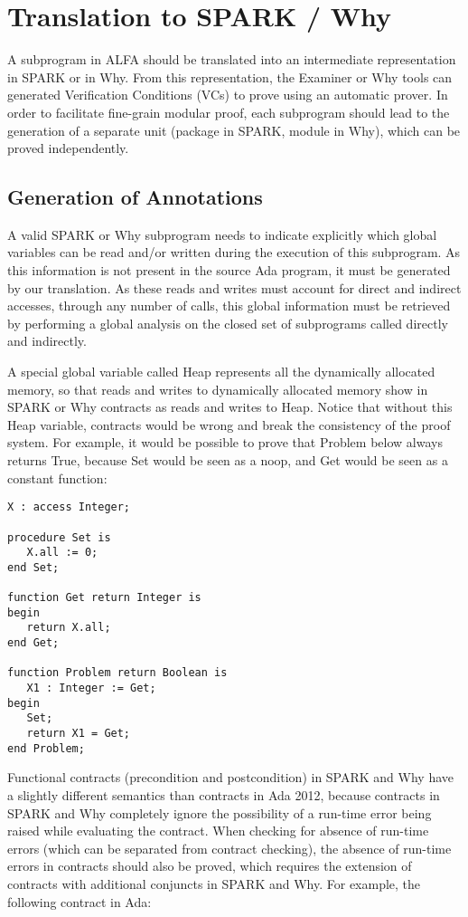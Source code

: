\documentclass{article}
\begin{document}
\section{Translation to SPARK / Why}

A subprogram in ALFA should be translated into an intermediate representation
in SPARK or in Why. From this representation, the Examiner or Why tools can
generated Verification Conditions (VCs) to prove using an automatic prover.  In
order to facilitate fine-grain modular proof, each subprogram should lead to
the generation of a separate unit (package in SPARK, module in Why), which can
be proved independently.

\subsection{Generation of Annotations}

A valid SPARK or Why subprogram needs to indicate explicitly which global
variables can be read and/or written during the execution of this
subprogram. As this information is not present in the source Ada program, it
must be generated by our translation. As these reads and writes must account
for direct and indirect accesses, through any number of calls, this global
information must be retrieved by performing a global analysis on the closed set
of subprograms called directly and indirectly.

A special global variable called Heap represents all the dynamically allocated
memory, so that reads and writes to dynamically allocated memory show in SPARK
or Why contracts as reads and writes to Heap. Notice that without this Heap
variable, contracts would be wrong and break the consistency of the proof
system. For example, it would be possible to prove that Problem below always
returns True, because Set would be seen as a noop, and Get would be seen as a
constant function:

\begin{verbatim}
X : access Integer;

procedure Set is
   X.all := 0;
end Set;

function Get return Integer is
begin
   return X.all;
end Get;

function Problem return Boolean is
   X1 : Integer := Get;
begin
   Set;
   return X1 = Get;
end Problem;
\end{verbatim}

Functional contracts (precondition and postcondition) in SPARK and Why have a
slightly different semantics than contracts in Ada 2012, because contracts in
SPARK and Why completely ignore the possibility of a run-time error being
raised while evaluating the contract. When checking for absence of run-time
errors (which can be separated from contract checking), the absence of run-time
errors in contracts should also be proved, which requires the extension of
contracts with additional conjuncts in SPARK and Why. For example, the
following contract in Ada:
\end{document}
